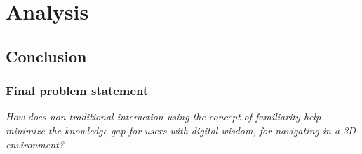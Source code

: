 \chapter{Analysis}







\section{Conclusion}
\subsection{Final problem statement}
\textit{How does non-traditional interaction using the concept of familiarity help minimize the knowledge gap for users with digital wisdom, for navigating in a 3D environment?}